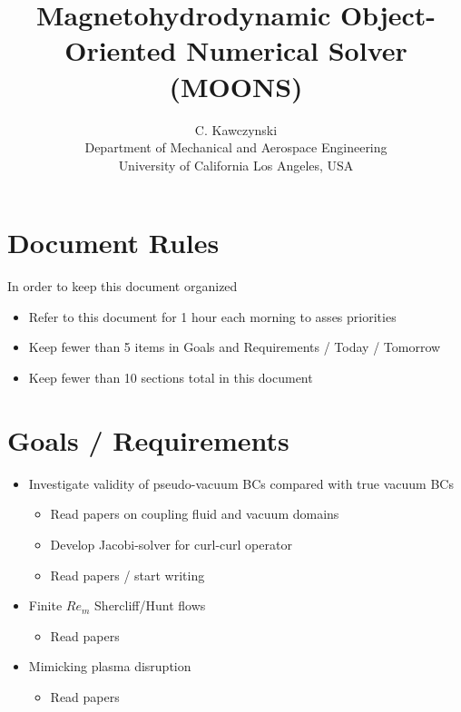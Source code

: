 \documentclass[11pt]{article}
\begin{document}
\doublespacing
\title{Magnetohydrodynamic Object-Oriented Numerical Solver (MOONS)}
\author{C. Kawczynski \\
Department of Mechanical and Aerospace Engineering \\
University of California Los Angeles, USA\\
}
\maketitle

\section{Document Rules}
In order to keep this document organized
\begin{itemize}
\item Refer to this document for 1 hour each morning to asses priorities
\item Keep fewer than 5 items in Goals and Requirements / Today / Tomorrow
\item Keep fewer than 10 sections total in this document
\end{itemize}

\section{Goals / Requirements}

\begin{itemize}
\item Investigate validity of pseudo-vacuum BCs compared with true vacuum BCs
	\begin{itemize}
	\item Read papers on coupling fluid and vacuum domains
	\item Develop Jacobi-solver for curl-curl operator
	\item Read papers / start writing
	\end{itemize}
\item Finite $Re_m$ Shercliff/Hunt flows
	\begin{itemize}
	\item Read papers
	\end{itemize}
\item Mimicking plasma disruption
	\begin{itemize}
	\item Read papers
	\end{itemize}
\end{itemize}
\end{document}
